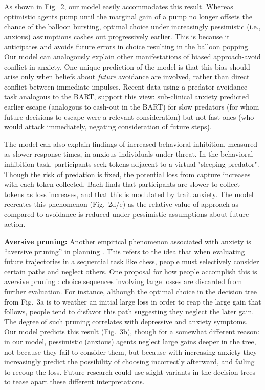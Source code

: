 \documentclass[11pt]{article} %
\begin{document}
As shown in Fig.~2, our model easily accommodates this result. Whereas optimistic agents pump until the marginal gain of a pump no longer offsets the chance of the balloon bursting, optimal choice under increasingly pessimistic (i.e., anxious) assumptions cashes out progressively earlier. This is because it anticipates and avoids future errors in choice resulting in the balloon popping. Our model can analogously explain other manifestations of biased approach-avoid conflict in anxiety\cite{Mobbs2019}. One unique prediction of the model is that this bias should arise only when beliefs about \emph{future} avoidance are involved, rather than direct conflict between immediate impulses. Recent data \cite{Mobbs2019} using a predator avoidance task analogous to the BART, support this view: sub-clinical anxiety predicted earlier escape (analogous to cash-out in the BART) for slow predators (for whom future decisions to escape were a relevant consideration) but not fast ones (who would attack immediately, negating consideration of future steps).

The model can also explain findings of increased behavioral inhibition, measured as slower response times, in anxious individuals under threat. \cite{bach2015} In the behavioral inhibition task, participants seek tokens adjacent to a virtual "sleeping predator". Though the risk of predation is fixed, the potential loss from capture increases with each token collected. Bach \cite{bach2015} finds that participants are slower to collect tokens as loss increases, and that this is modulated by trait anxiety. The model recreates this phenomenon (Fig.~2d/e) as the relative value of approach as compared to avoidance is reduced under pessimistic assumptions about future action. 

\textbf{Aversive pruning:} Another empirical phenomenon associated with anxiety is ``aversive pruning'' in planning \cite{Huys2012, Lally2017}. This refers to the idea that when evaluating future trajectories in a sequential task like chess, people must selectively consider certain paths and neglect others. One proposal for how people accomplish this is aversive pruning \citep{Huys2012}: choice sequences involving large losses are discarded from further evaluation. For instance, although the optimal choice in the decision tree from Fig.~3a is to weather an initial large loss in order to reap the large gain that follows, people tend to disfavor this path suggesting they neglect the later gain. The degree of such pruning correlates with depressive \cite{Huys2012} and anxiety \cite{Lally2017} symptoms. Our model predicts this result (Fig.~3b), though for a somewhat different reason: in our model, pessimistic (anxious) agents neglect large gains deeper in the tree, not because they fail to consider them, but because with increasing anxiety they increasingly predict the possibility of choosing incorrectly afterward, and failing to recoup the loss. Future research could use slight variants in the decision trees to tease apart these different interpretations.
\end{document}
